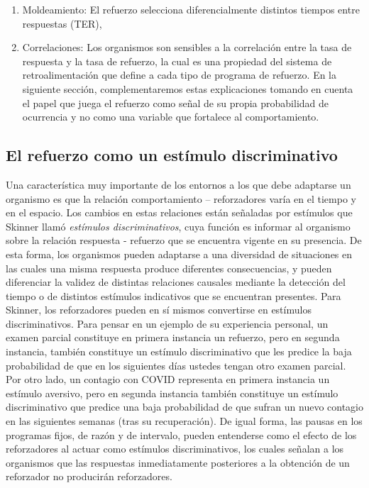 \documentclass[
  letterpaper,
]{book}
\providecommand{\tightlist}{%
  \setlength{\itemsep}{0pt}\setlength{\parskip}{0pt}}\usepackage{longtable,booktabs,array}
\begin{document}
\begin{enumerate}
\def\labelenumi{\arabic{enumi}.}
\tightlist
\item
  Moldeamiento: El refuerzo selecciona diferencialmente distintos
  tiempos entre respuestas (TER),\\
\item
  Correlaciones: Los organismos son sensibles a la correlación entre la
  tasa de respuesta y la tasa de refuerzo, la cual es una propiedad del
  sistema de retroalimentación que define a cada tipo de programa de
  refuerzo. En la siguiente sección, complementaremos estas
  explicaciones tomando en cuenta el papel que juega el refuerzo como
  señal de su propia probabilidad de ocurrencia y no como una variable
  que fortalece al comportamiento.
\end{enumerate}

\subsection{El refuerzo como un estímulo
discriminativo}\label{el-refuerzo-como-un-estuxedmulo-discriminativo}

Una característica muy importante de los entornos a los que debe
adaptarse un organismo es que la relación comportamiento -- reforzadores
varía en el tiempo y en el espacio. Los cambios en estas relaciones
están señaladas por estímulos que Skinner llamó \emph{estímulos
discriminativos}, cuya función es informar al organismo sobre la
relación respuesta - refuerzo que se encuentra vigente en su presencia.
De esta forma, los organismos pueden adaptarse a una diversidad de
situaciones en las cuales una misma respuesta produce diferentes
consecuencias, y pueden diferenciar la validez de distintas relaciones
causales mediante la detección del tiempo o de distintos estímulos
indicativos que se encuentran presentes. Para Skinner, los reforzadores
pueden en sí mismos convertirse en estímulos discriminativos. Para
pensar en un ejemplo de su experiencia personal, un examen parcial
constituye en primera instancia un refuerzo, pero en segunda instancia,
también constituye un estímulo discriminativo que les predice la baja
probabilidad de que en los siguientes días ustedes tengan otro examen
parcial. Por otro lado, un contagio con COVID representa en primera
instancia un estímulo aversivo, pero en segunda instancia también
constituye un estímulo discriminativo que predice una baja probabilidad
de que sufran un nuevo contagio en las siguientes semanas (tras su
recuperación). De igual forma, las pausas en los programas fijos, de
razón y de intervalo, pueden entenderse como el efecto de los
reforzadores al actuar como estímulos discriminativos, los cuales
señalan a los organismos que las respuestas inmediatamente posteriores a
la obtención de un reforzador no producirán reforzadores.
\end{document}
